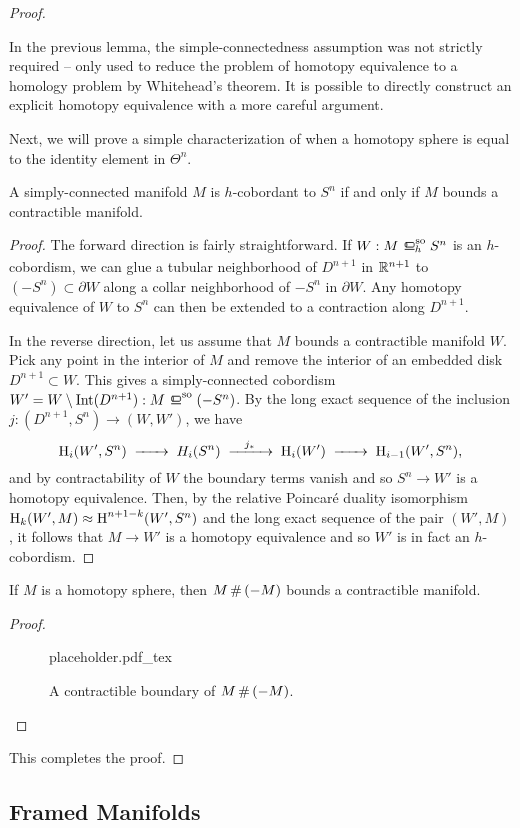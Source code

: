 \begin{proof}
	\begin{remark}
		In the previous lemma, the simple-connectedness assumption was not strictly required -- only used to reduce the problem of homotopy equivalence to a homology problem by Whitehead's theorem. It is possible to directly construct an explicit homotopy equivalence with a more careful argument.
	\end{remark}

	Next, we will prove a simple characterization of when a homotopy sphere is equal to the identity element in $\Theta^n$.

	\begin{lemma}\label{lemma:null-h-cobordant-iff-bounds-contractible}
		A simply-connected manifold $M$ is $h$-cobordant to $S^n$ if and only if $M$ bounds a contractible manifold.
	\end{lemma}
	\begin{proof}
		The forward direction is fairly straightforward. If $W : M\sohbord S^n$ is an $h$-cobordism, we can glue a tubular neighborhood of $D^{n+1}$ in $\mathbb{R}^{n+1}$ to $(-S^n)\subset \partial W$ along a collar neighborhood of $-S^n$ in $\partial W$. Any homotopy equivalence of $W$ to $S^n$ can then be extended to a contraction along $D^{n+1}$.

		In the reverse direction, let us assume that $M$ bounds a contractible manifold $W$. Pick any point in the interior of $M$ and remove the interior of an embedded disk $D^{n+1}\subset W$. This gives a simply-connected cobordism $W'=W\setminus \Int(D^{n+1}) : M\sobord (-S^n)$. By the long exact sequence of the inclusion $j : (D^{n+1}, S^n) \to (W,W')$, we have
		\[
			\H_i(W', S^n) \lkxto H_i(S^n)\lkxto[j_*] \H_i(W')\lkxto \H_{i-1}(W',S^n),
		\]
		and by contractability of $W$ the boundary terms vanish and so $S^n \to W'$ is a homotopy equivalence. Then, by the relative Poincar\'e duality isomorphism $\operatorname{H}_k(W',M)\approx \operatorname{H}^{n+1-k}(W', S^n)$ and the long exact sequence of the pair $(W',M)$, it follows that $M\to W'$ is a homotopy equivalence and so $W'$ is in fact an $h$-cobordism. 
	\end{proof}

	\begin{lemma}
		If $M$ is a homotopy sphere, then $M\,\#\,(-M)$ bounds a contractible manifold.
	\end{lemma}
	\begin{proof}
		\begin{figure}[ht]
			\centering
			{placeholder.pdf_tex}
			\caption{A contractible boundary of $M\,\#\,(-M)$.}
		\end{figure}
	\end{proof}


	\noindent This completes the proof.
\end{proof}

\subsection{Framed Manifolds}

\begin{definition}
\end{definition}
